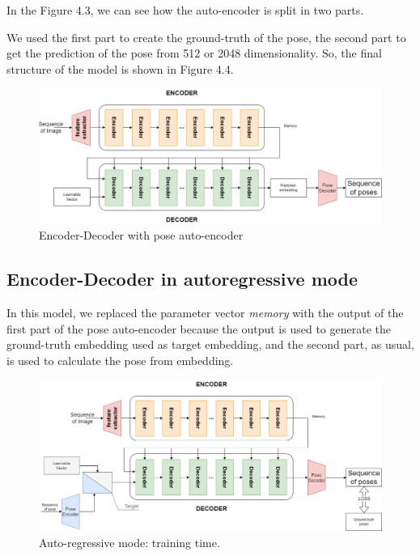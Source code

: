 In the Figure 4.3, we can see how the auto-encoder is split in two parts.

We used the first part to create the ground-truth of the pose, the second part to get the prediction of the pose from 512 or 2048 dimensionality.
So, the final structure of the model is shown in Figure 4.4.
\begin{figure}[H]
    \centering
    \includegraphics[width=\textwidth]{images/4_1_encoder_decoder_with_pose_autoencoder}
    \caption{Encoder-Decoder with pose auto-encoder}\label{fig:figure-encoder-decoder-with-pose-encoder}
\end{figure}

\subsection{Encoder-Decoder in autoregressive mode}\label{subsec:encoder-decoder-in-autoregressive-mode}
In this model, we replaced the parameter vector \textit{memory} with the output of the first part of the pose auto-encoder because the output is used to generate the ground-truth embedding used as target embedding, and the second part, as usual, is used to calculate the pose from embedding.

\begin{figure}[H]
    \centering
    \includegraphics[width=\textwidth]{images/4_1_ar_train}
    \caption{Auto-regressive mode: training time.}\label{fig:figure-auto-regressive-train}
\end{figure}

